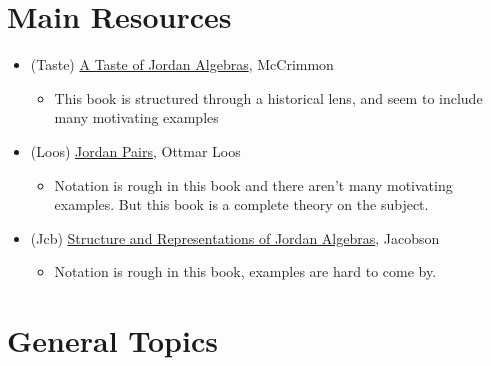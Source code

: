 \documentclass[12pt]{amsart}
\begin{document}
\section*{Main Resources}
\begin{itemize}
    \item[] (Taste) \href{https://link.springer.com/book/10.1007/b97489}{A Taste of Jordan Algebras}, McCrimmon
        \begin{itemize}
            \item This book is structured through a historical lens, and seem to include many motivating examples
        \end{itemize}
    \item[] (Loos) \href{https://link.springer.com/book/10.1007/BFb0080843}{Jordan Pairs}, Ottmar Loos
        \begin{itemize}
            \item Notation is rough in this book and there aren't many motivating examples. But this book is a complete theory on the subject.
        \end{itemize}
    \item[] (Jcb) \href{https://pub.deadnet.se/Books_and_manuals_on_various_stuff/Mathematics/Algebra/Structure%20and%20Representation%20of%20Jordan%20Algebras%20-%20N.%20Jacobson.pdf}{Structure and Representations of Jordan Algebras}, Jacobson
        \begin{itemize}
            \item Notation is rough in this book, examples are hard to come by.
        \end{itemize}
\end{itemize}

\section*{General Topics}
\end{document}
